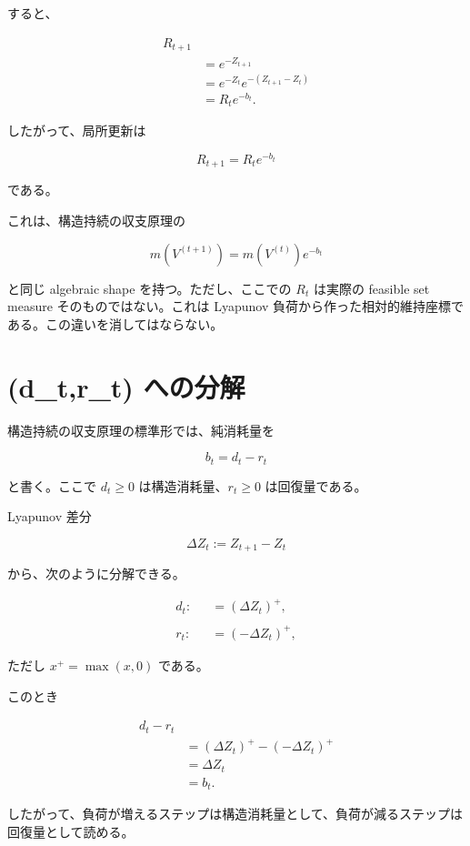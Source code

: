 \documentclass[12pt,a4paper]{article}
\begin{document}
すると、

\[
\begin{aligned}
R_{t+1} \\
&= e^{-Z_{t+1}} \\
&= e^{-Z_{t}}e^{-(Z_{t+1}-Z_{t})} \\
&= R_{t} e^{-b_{t}}.
\end{aligned}
\]

したがって、局所更新は

\[
R_{t+1}=R_{t} e^{-b_{t}}
\]

である。

これは、構造持続の収支原理の

\[
m(V^{(t+1)})=m(V^{(t)})e^{-b_{t}}
\]

と同じ algebraic shape を持つ。ただし、ここでの \(R_{t}\) は実際の feasible set measure そのものではない。これは Lyapunov 負荷から作った相対的維持座標である。この違いを消してはならない。

\section{(d\_t,r\_t) への分解}\label{d_tr_t-ux3078ux306eux5206ux89e3}

構造持続の収支原理の標準形では、純消耗量を

\[
b_{t}=d_{t}-r_{t}
\]

と書く。ここで \(d_{t}\ge 0\) は構造消耗量、\(r_{t}\ge 0\) は回復量である。

Lyapunov 差分

\[
\Delta Z_{t}:=Z_{t+1}-Z_{t}
\]

から、次のように分解できる。

\[
\begin{aligned}
d_{t} :&= (\Delta Z_{t})^+, \\
\qquad \\
r_{t} :&= (-\Delta Z_{t})^+,
\end{aligned}
\]

ただし \(x^+=\max(x,0)\) である。

このとき

\[
\begin{aligned}
d_{t}-r_{t} \\
&= (\Delta Z_{t})^+ - (-\Delta Z_{t})^+ \\
&= \Delta Z_{t} \\
&= b_{t}.
\end{aligned}
\]

したがって、負荷が増えるステップは構造消耗量として、負荷が減るステップは回復量として読める。
\end{document}
